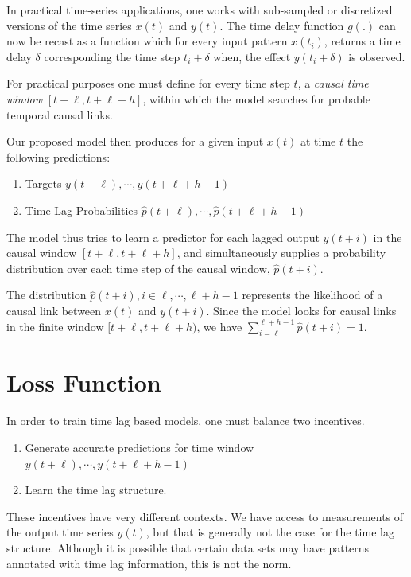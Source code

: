 \documentclass[twoside]{article}
\begin{document}
In practical time-series applications, one works with sub-sampled or discretized versions of the time 
series $x(t)$ and $y(t)$. The time delay function $g(.)$ can now be recast as a function which for every
input pattern $x(t_i)$, returns a time delay $\delta$ corresponding the time step $t_i + \delta$ when,
the effect $y(t_i + \delta)$ is observed.

For practical purposes one must define for every time step $t$, a \emph{causal time window} $[t+\ell, t+\ell+h]$, within which the model searches for probable temporal causal links.

Our proposed model then produces for a given input $x(t)$ at time $t$ the following predictions:

\begin{enumerate}
\item Targets $y(t+\ell), \cdots, y(t+\ell+h-1)$
\item Time Lag Probabilities $\hat{p}(t+\ell), \cdots, \hat{p}(t+\ell+h-1)$
\end{enumerate}

The model thus tries to learn a predictor for each lagged output $y(t+i)$ in the causal window $[t+\ell, t+\ell+h]$, and simultaneously supplies a probability distribution over each time step of the causal window, $\hat{p}(t+i)$.

The distribution $\hat{p}(t+i), i \in {\ell, \cdots, \ell+h-1}$ represents the 
likelihood of a causal link between $x(t)$ and $y(t+i)$. Since the model looks
for causal links in the finite window $[t+\ell, t+\ell+h)$, we have 
$\sum^{\ell+h-1}_{i = \ell}{\hat{p}(t + i)} = 1$.


\section{Loss Function}

In order to train time lag based models, one must balance two incentives.

\begin{enumerate}
    \item Generate accurate predictions for time window $y(t+\ell), \cdots, y(t+\ell+h-1)$
    \item Learn the time lag structure.
\end{enumerate}

These incentives have very different contexts. We have access to measurements of the output time series $y(t)$, but that is generally 
not the case for the time lag structure. Although it is possible that certain data sets may have patterns annotated with 
time lag information, this is not the norm.
\end{document}
